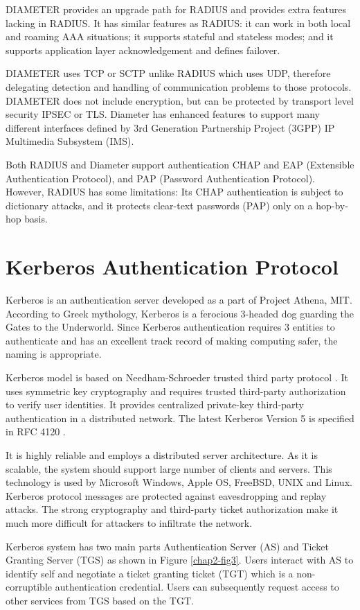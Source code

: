 \begin{multicols}{2}
DIAMETER provides an upgrade path for RADIUS and provides extra features lacking in RADIUS. It has similar features as RADIUS: it can work in both local and roaming AAA situations; it supports stateful and stateless modes; and it supports application layer acknowledgement and defines failover.

DIAMETER uses TCP or SCTP unlike RADIUS which uses UDP, therefore delegating detection and handling of communication problems to those protocols. DIAMETER does not include encryption, but can be protected by transport level security IPSEC or TLS. Diameter has enhanced features to support many different interfaces defined by 3rd Generation Partnership Project (3GPP) IP Multimedia Subsystem (IMS).

Both RADIUS and Diameter support authentication CHAP and EAP (Extensible Authentication Protocol), and PAP (Password Authentication Protocol). However, RADIUS has some limitations: Its CHAP authentication is subject to dictionary attacks, and it protects clear-text passwords (PAP) only on a hop-by-hop basis.\\[-21pt]

\section{Kerberos Authentication Protocol}

\vskip -3pt

Kerberos is an authentication server developed as a part of Project Athena, MIT. According to Greek mythology, Kerberos is a ferocious 3-headed dog guarding the Gates to the Underworld. Since Kerberos authentication requires 3 entities to authenticate and has an excellent track record of making computing safer, the naming is appropriate. 

Kerberos model is based on Needham-Schroeder trusted third party protocol \cite{chap2-key1}. It uses symmetric key cryptography and requires trusted third-party authorization to verify user identities. It provides centralized private-key third-party authentication in a distributed network. The latest Kerberos Version 5 is specified in RFC 4120 \cite{chap2-key12}.

It is highly reliable and employs a distributed server architecture. As it is scalable, the system should support large number of clients and servers. This technology is used by Microsoft Windows, Apple OS, FreeBSD, UNIX and Linux. Kerberos protocol messages are protected against eavesdropping and replay attacks. The strong cryptography and third-party ticket authorization make it much more difficult for attackers to infiltrate the network.

Kerberos system has two main parts Authentication Server (AS) and Ticket Granting Server (TGS) as shown in Figure \ref{chap2-fig3}. Users interact with AS to identify self and negotiate a ticket granting ticket (TGT) which is a non-corruptible authentication credential. Users can subsequently request access to other services from TGS based on the TGT.
\end{multicols}

